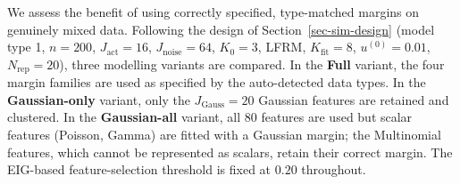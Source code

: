 \documentclass[
  letterpaper,
  DIV=11,
  numbers=noendperiod]{scrartcl}
\begin{document}
We assess the benefit of using correctly specified, type-matched margins
on genuinely mixed data. Following the design of
Section~\ref{sec-sim-design} (model type 1, \(n = 200\),
\(J_{\text{act}} = 16\), \(J_{\text{noise}} = 64\), \(K_0 = 3\), LFRM,
\(K_{\text{fit}} = 8\), \(u^{(0)} = 0.01\), \(N_{\text{rep}} = 20\)),
three modelling variants are compared. In the \textbf{Full} variant, the
four margin families are used as specified by the auto-detected data
types. In the \textbf{Gaussian-only} variant, only the
\(J_{\text{Gauss}} = 20\) Gaussian features are retained and clustered.
In the \textbf{Gaussian-all} variant, all 80 features are used but
scalar features (Poisson, Gamma) are fitted with a Gaussian margin; the
Multinomial features, which cannot be represented as scalars, retain
their correct margin. The EIG-based feature-selection threshold is fixed
at \(0.20\) throughout.

\begin{table}

\caption{\label{tbl-margin-heterogeneity}Clustering accuracy and
EIG-based feature-selection performance under heterogeneous
vs.~mis-specified margins (\(n = 200\), \(K_0 = 3\),
\(J_{\text{act}} = 16\), 20 replications, EIG threshold
\(\tau = 0.20\)). \({}^\dagger\)\textasciitilde Measured over the 20
Gaussian features only (4 active, 16 noise).}


\end{table}%
\end{document}
